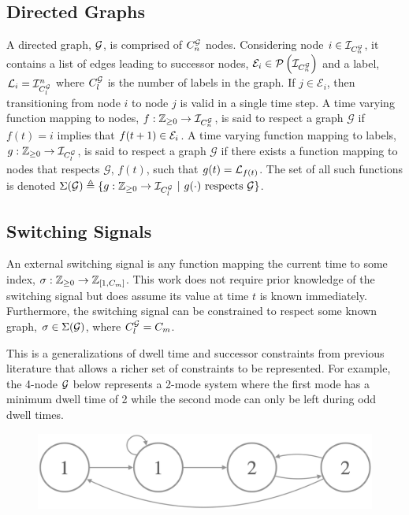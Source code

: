 \subsection{Directed Graphs}
A directed graph, $\mathcal{G}$, is comprised of $\gnumnodes$ nodes. Considering node $i\in\idxset{\gnumnodes}$, it contains a list of edges leading to successor nodes, $\gnodeedges{i}\in\PowerSet{\idxset{\gnumnodes}}$ and a label, $\mathcal{L}_{i}=\mathcal{I}_{C_l^{\mathcal{G}}}^n$ where $C_l^{\mathcal{G}}$ is the number of labels in the graph. If $j\in\mathcal{E}_i$, then transitioning from node $i$ to node $j$ is valid in a single time step. A time varying function mapping to nodes, $f:\int\rgeq{0}\rightarrow\idxset{\gnumnodes}$, is said to respect a graph $\mathcal{G}$ if $f(t)=i$ implies that $f(t+1)\in\gnodeedges{i}$. A time varying function mapping to labels, $g:\mathbb{Z}_{\geq 0}\rightarrow\mathcal{I}_{C_l^{\mathcal{G}}}$, is said to respect a graph $\mathcal{G}$ if there exists a function mapping to nodes that respects $\mathcal{G}$, $f(t)$, such that $g(t)=\mathcal{L}_{f(t)}$. The set of all such functions is denoted $\Sigma(\mathcal{G})\triangleq\{g:\int\rgeq{0}\rightarrow\idxset{\gnumlabels}\ |\ g(\cdot)\text{ respects }\graph\}$. 

\subsection{Switching Signals}
An external switching signal is any function mapping the current time to some index, $\ss:\int\rgeq{0}\rightarrow\int\rii{1}{\nummodes}$. This work does not require prior knowledge of the switching signal but does assume its value at time $t$ is known immediately. Furthermore, the switching signal can be constrained to respect some known graph, ${\sigma}\in\Sigma(\mathcal{G})$, where $\gnumlabels=\nummodes$. 
\begin{remark}
This is a generalizations of dwell time and successor constraints from previous literature that allows a richer set of constraints to be represented. For example, the 4-node $\mathcal{G}$ below represents a 2-mode system where the first mode has a minimum dwell time of 2 while the second mode can only be left during odd dwell times.
\begin{figure}[h!]
\centering
\includegraphics[scale=0.15]{./figures/graph_remark}
\end{figure}
\end{remark}

